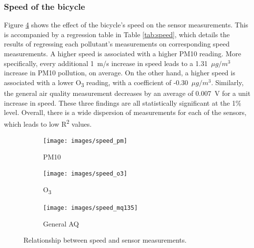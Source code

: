 \documentclass[11pt]{report}
\begin{document}
\subsubsection{Speed of the bicycle}

Figure \ref{fig:speed} shows the effect of the bicycle's speed on the sensor measurements. This is accompanied by a regression table in Table \ref{tab:speed}, which details the results of regressing each pollutant's measurements on corresponding speed measurements. A higher speed is associated with a higher PM10 reading. More specifically, every additional 1~m/s increase in speed leads to a 1.31~$\mu g/m^3$ increase in PM10 pollution, on average. On the other hand, a higher speed is associated with a lower O\textsubscript{3} reading, with a coefficient of -0.30~$\mu g/m^3$. Similarly, the general air quality measurement decreases by an average of 0.007~V for a unit increase in speed. These three findings are all statistically significant at the 1\% level. Overall, there is a wide dispersion of measurements for each of the sensors, which leads to low R\textsuperscript{2} values.

\begin{figure}[!tb]
    \centering
    \begin{minipage}{1\linewidth}
            \begin{subfigure}[t]{.32\linewidth}
                \texttt{[image: images/speed\_pm]}
                \caption{PM10}
                \label{fig:speed_pm10}
            \end{subfigure}
            \begin{subfigure}[t]{.32\linewidth}
            	\texttt{[image: images/speed\_o3]}
            	\caption{O\textsubscript{3}}
            	\label{fig:speed_o3}
	        \end{subfigure}
            \begin{subfigure}[t]{.32\linewidth}
                \texttt{[image: images/speed\_mq135]}
                \caption{General AQ}
                \label{fig:speed_mq135}
            \end{subfigure}
        \end{minipage}
    \caption[Relationship between speed and sensor measurements.]{Relationship between speed and sensor measurements.}
    \label{fig:speed}
\end{figure}

\end{document}
